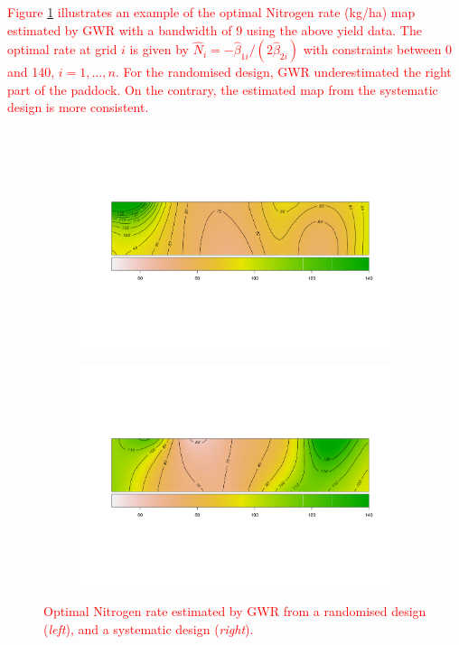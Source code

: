 \documentclass[a4paper]{article}   	%
\newcommand{\revision}[1]{\textcolor{red}{#1}}
\begin{document}
\revision{Figure \ref{fig:optNmap} illustrates an example of the optimal Nitrogen rate (kg/ha) map estimated by GWR with a bandwidth of 9 using the above yield data. The optimal rate at grid $i$ is given by $\hat{N}_i = -\hat{\beta}_{1i}/(2\hat{\beta}_{2i})$ with constraints between 0 and 140, $i=1,\ldots,n$. For the randomised design, GWR underestimated the right part of the paddock. On the contrary, the estimated map from the systematic design is more consistent.}

\begin{figure}[!htp]
	\begin{subfigure}[t]{0.45\textwidth}
		\centering
		\includegraphics[width=\linewidth]{optN_rand_matB9.pdf}
 \end{subfigure}
	\hspace{0.05\textwidth}
	\begin{subfigure}[t]{0.45\textwidth}
		\centering
		\includegraphics[width=\linewidth]{optN_syst_matB9.pdf}
 \end{subfigure}
	\caption{\revision{Optimal Nitrogen rate estimated by GWR from a randomised design (\textit{left}), and a systematic design (\textit{right}).}}\label{fig:optNmap}
\end{figure}
\end{document}
